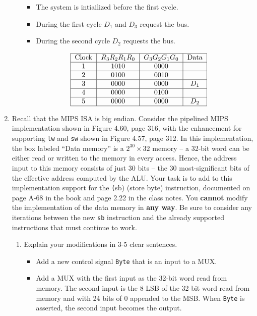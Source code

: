 \documentclass[10pt,letterpaper]{article}
\begin{document}
\begin{enumerate}[label=\textbf{Problem \arabic*.}]
\begin{enumerate}[label=\Alph*)]
		\begin{itemize}
			\item The system is intiailized before the first cycle. 
			\item During the first cycle $D_1$ and $D_3$ request the bus.
			\item During the second cycle $D_2$ requests the bus.
		\end{itemize}
		\[\begin{tabular} { |c|c|c|c| }
		\hline
		Clock & $R_3R_2R_1R_0$ & $G_3G_2G_1G_0$ & Data \\
		\hline
		1 & 1010 & 0000 & \\
		\hline
		2 & 0100 & 0010 & \\
		\hline
		3 & 0000 & 0000 & $D_1$ \\
		\hline
		4 & 0000 & 0100 & \\
		\hline
		5 & 0000 & 0000 & $D_2$ \\
		\hline
		\end{tabular}\]
	\end{enumerate} 
\item Recall that the MIPS ISA is big endian. Consider the pipelined MIPS implementation shown in Figure 4.60, page 316, with the enhancement for supporting \texttt{lw} and \texttt{sw} shown in Figure 4.57, page 312. In this implementation, the box labeled ``Data memory'' is a $2^{30}\times32$ memory -- a 32-bit word can be either read or written to the memory in every access. Hence, the address input to this memory consists of just 30 bits -- the 30 most-significant bits of the effective address computed by the ALU. Your task is to add to this implementation support for the \texttt(sb) (store byte) instruction, documented on page A-68 in the book and page 2.22 in the class notes. You \textbf{cannot} modify the implementation of the data memory in \textbf{any way}. Be sure to consider any iterations between the new \texttt{sb} instruction and the already supported instructions that must continue to work.
	\begin{enumerate}[label=\Alph*)]
	\item Explain your modifications in 3-5 clear sentences.
		\begin{itemize}
			\item Add a new control signal \texttt{Byte} that is an input to a MUX. 
			\item Add a MUX with the first input as the 32-bit word read from memory. The second input is the 8 LSB of the 32-bit word read from memory and with 24 bits of 0 appended to the MSB. When \texttt{Byte} is asserted, the second input becomes the output.

\end{itemize}
\end{enumerate}
\end{enumerate}
\end{document}
